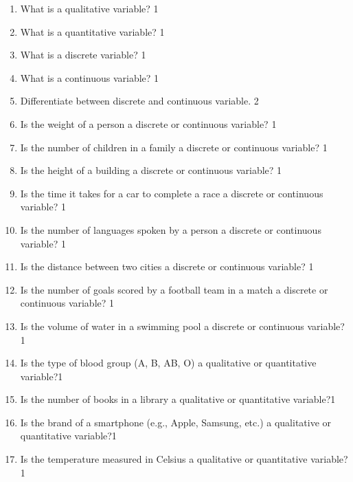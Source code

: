 \documentclass[a4paper,oneside]{book}
\begin{document}
\begin{enumerate}
\item What is a qualitative variable? \hfill 1

\item What is a quantitative variable? \hfill 1

\item What is a discrete variable? \hfill 1

\item What is a continuous variable? \hfill 1

\item Differentiate between discrete and continuous variable. \hfill 2
\item Is the weight of a person a discrete or continuous variable? \hfill 1

\item Is the number of children in a family a discrete or continuous variable? \hfill 1

\item Is the height of a building a discrete or continuous variable? \hfill 1

\item Is the time it takes for a car to complete a race a discrete or continuous variable? \hfill 1

\item Is the number of languages spoken by a person a discrete or continuous variable? \hfill 1

\item Is the distance between two cities a discrete or continuous variable? \hfill 1


\item Is the number of goals scored by a football team in a match a discrete 
or continuous variable? \hfill 1

\item Is the volume of water in a swimming pool a discrete or continuous 
variable? \hfill 1

\item Is the type of blood group (A, B, AB, O) a qualitative or 
quantitative variable?\hfill 1

\item Is the number of books in a library a qualitative or quantitative 
variable?\hfill 1

\item Is the brand of a smartphone (e.g., Apple, Samsung, etc.) 
a qualitative or quantitative variable?\hfill 1

\item Is the temperature measured in Celsius a qualitative or quantitative variable?\hfill 1


\end{enumerate}
\end{document}
